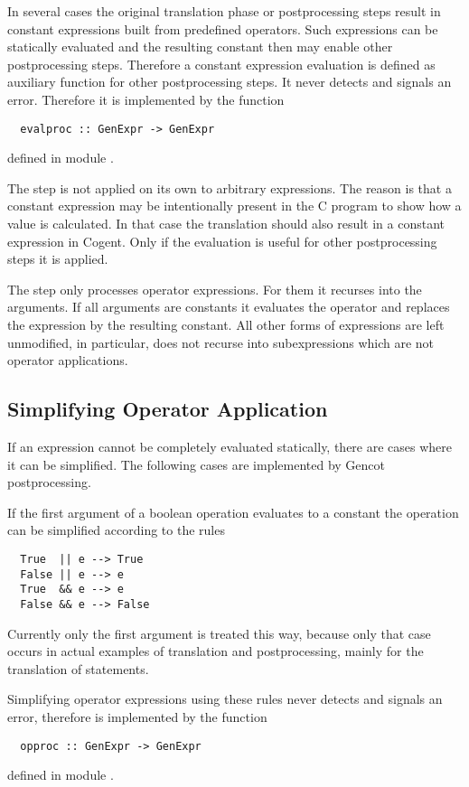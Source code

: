 In several cases the original translation phase or postprocessing steps result in constant expressions built
from predefined operators. Such expressions can be statically evaluated and the resulting constant then may
enable other postprocessing steps. Therefore a constant expression evaluation is defined as auxiliary 
function for other postprocessing steps. It never detects and signals an error. Therefore it is implemented
by the function
\begin{verbatim}
  evalproc :: GenExpr -> GenExpr
\end{verbatim}
defined in module .

The  step is not applied on its own to arbitrary expressions. The reason is that a constant
expression may be intentionally present in the C program to show how a value is calculated. In that case the 
translation should also result in a constant expression in Cogent. Only if the evaluation is useful for other 
postprocessing steps it is applied.

The  step only processes operator expressions. For them it recurses into the arguments. If all arguments
are constants it evaluates the operator and replaces the expression by the resulting constant. All other forms
of expressions are left unmodified, in particular,  does not recurse into subexpressions which are
not operator applications.

\subsection{Simplifying Operator Application}
\label{impl-post-op}

If an expression cannot be completely evaluated statically, there are cases where it can be simplified.
The following cases are implemented by Gencot postprocessing.

If the first argument of a boolean operation evaluates to a constant the operation can be simplified according 
to the rules
\begin{verbatim}
  True  || e --> True
  False || e --> e
  True  && e --> e
  False && e --> False
\end{verbatim}
Currently only the first argument is treated this way, because only that case occurs in actual examples of translation
and postprocessing, mainly for the translation of  statements.

Simplifying operator expressions using these rules never detects and signals an error, therefore is implemented by the function
\begin{verbatim}
  opproc :: GenExpr -> GenExpr
\end{verbatim}
defined in module .

